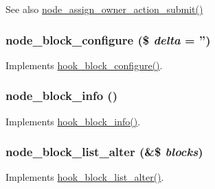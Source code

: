 \begin{DoxySeeAlso}{See also}
\hyperlink{node_8module_a777bb331cf28f580e2a3030d95d9f254}{node\_\-assign\_\-owner\_\-action\_\-submit()} 
\end{DoxySeeAlso}
\hypertarget{node_8module_a593cb533d01af96e961a71a919784c78}{
\subsubsection[{node\_\-block\_\-configure}]{\setlength{\rightskip}{0pt plus 5cm}node\_\-block\_\-configure (\$ {\em delta} = {\ttfamily ''})}}
\label{node_8module_a593cb533d01af96e961a71a919784c78}
Implements \hyperlink{group__hooks_gacc86fefd1e0299f387f79a37dd1a48b7}{hook\_\-block\_\-configure()}. \hypertarget{node_8module_a3fe724ba9acdd433c716acaf8477034a}{
\subsubsection[{node\_\-block\_\-info}]{\setlength{\rightskip}{0pt plus 5cm}node\_\-block\_\-info ()}}
\label{node_8module_a3fe724ba9acdd433c716acaf8477034a}
Implements \hyperlink{group__hooks_ga2bd926c3e90deeba0c3ba64fb3c64d73}{hook\_\-block\_\-info()}. \hypertarget{node_8module_ab6bd10a5b0559113f2b32f84c35b58cf}{
\subsubsection[{node\_\-block\_\-list\_\-alter}]{\setlength{\rightskip}{0pt plus 5cm}node\_\-block\_\-list\_\-alter (\&\$ {\em blocks})}}
\label{node_8module_ab6bd10a5b0559113f2b32f84c35b58cf}
Implements \hyperlink{group__hooks_gaf38c7633b52b18831e3ec0459d8e9f41}{hook\_\-block\_\-list\_\-alter()}.

